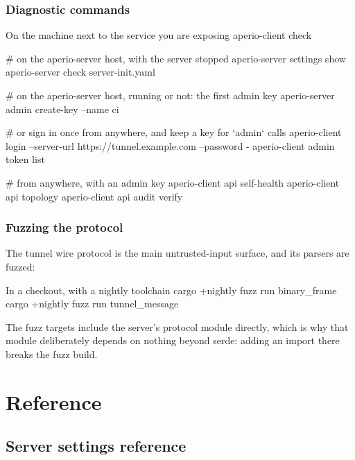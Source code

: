 \documentclass[11pt,a4paper,oneside]{book}
\begin{document}
\section{Diagnostic commands}

\begin{codecard}[aperiosh]{On the machine next to the service you are exposing}
aperio-client check

# on the aperio-server host, with the server stopped
aperio-server settings show
aperio-server check server-init.yaml

# on the aperio-server host, running or not: the first admin key
aperio-server admin create-key --name ci

# or sign in once from anywhere, and keep a key for `admin` calls
aperio-client login --server-url https://tunnel.example.com --password -
aperio-client admin token list

# from anywhere, with an admin key
aperio-client api self-health
aperio-client api topology
aperio-client api audit verify
\end{codecard}

\section{Fuzzing the protocol}

The tunnel wire protocol is the main untrusted-input surface, and its
parsers are fuzzed:

\begin{codecard}[aperiosh]{In a checkout, with a nightly toolchain}
cargo +nightly fuzz run binary_frame
cargo +nightly fuzz run tunnel_message
\end{codecard}

The fuzz targets include the server's protocol module directly, which is
why that module deliberately depends on nothing beyond serde: adding an
import there breaks the fuzz build.

\appendix
\part{Reference}

\chapter{Server settings reference}
\label{app:server}
\end{document}
